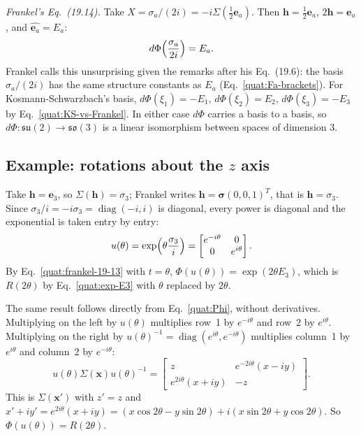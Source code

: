 \emph{Frankel's Eq.~(19.14).} Take $X=\sigma_a/(2i)=-i\Sigma(\frac12\mathbf e_a)$.
Then $\mathbf h=\frac12\mathbf e_a$, $2\mathbf h=\mathbf e_a$, and
$\widehat{\mathbf e_a}=E_a$:
\begin{equation}\label{quat:frankel-19-14}
 d\Phi\Bigl(\frac{\sigma_a}{2i}\Bigr)=E_a .
\end{equation}
Frankel calls this unsurprising given the remarks after his Eq.~(19.6): the
basis $\sigma_a/(2i)$ has the same structure constants as $E_a$
(Eq.~\eqref{quat:Fa-brackets}). For Kosmann-Schwarzbach's basis,
$d\Phi(\xi_1)=-E_1$, $d\Phi(\xi_2)=E_2$, $d\Phi(\xi_3)=-E_3$ by
Eq.~\eqref{quat:KS-vs-Frankel}. In either case $d\Phi$ carries a basis to a
basis, so $d\Phi\colon\mathfrak{su}(2)\to\mathfrak{so}(3)$ is a linear
isomorphism between spaces of dimension $3$.

\subsection{Example: rotations about the \texorpdfstring{$z$}{z} axis}
Take $\mathbf h=\mathbf e_3$, so $\Sigma(\mathbf h)=\sigma_3$; Frankel
writes $\mathbf h=\boldsymbol\sigma(0,0,1)^T$, that is $\mathbf h=\sigma_3$.
Since $\sigma_3/i=-i\sigma_3=\operatorname{diag}(-i,i)$ is diagonal, every
power is diagonal and the exponential is taken entry by entry:
\begin{equation}
 u(\theta)=\exp\Bigl(\theta\frac{\sigma_3}{i}\Bigr)
 =\begin{bmatrix}e^{-i\theta}&0\\0&e^{i\theta}\end{bmatrix}.
\end{equation}
By Eq.~\eqref{quat:frankel-19-13} with $t=\theta$,
$\Phi(u(\theta))=\exp(2\theta E_3)$, which is $R(2\theta)$ by
Eq.~\eqref{quat:exp-E3} with $\theta$ replaced by $2\theta$.

The same result follows directly from Eq.~\eqref{quat:Phi}, without
derivatives. Multiplying on the left by $u(\theta)$ multiplies row~1 by
$e^{-i\theta}$ and row~2 by $e^{i\theta}$. Multiplying on the right by
$u(\theta)^{-1}=\operatorname{diag}(e^{i\theta},e^{-i\theta})$ multiplies
column~1 by $e^{i\theta}$ and column~2 by $e^{-i\theta}$:
\begin{equation}
 u(\theta)\Sigma(\mathbf x)u(\theta)^{-1}
 =\begin{bmatrix}z&e^{-2i\theta}(x-iy)\\e^{2i\theta}(x+iy)&-z\end{bmatrix}.
\end{equation}
This is $\Sigma(\mathbf x')$ with $z'=z$ and
$x'+iy'=e^{2i\theta}(x+iy)=(x\cos2\theta-y\sin2\theta)
+i(x\sin2\theta+y\cos2\theta)$. So $\Phi(u(\theta))=R(2\theta)$.

